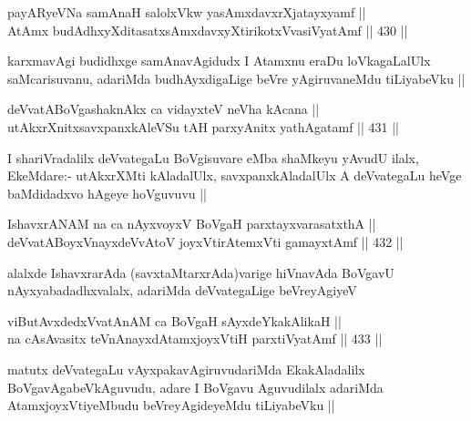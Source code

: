 \begin{shl}
payARyeVNa samAnaH salolxVkw yasAmxdavxrXjatayxyamf || \\
AtAmx budAdhxyXditasatxsAmxdavxyXtirikotxV\s vasiVyatAmf ||  430 || 
\end{shl}

\begin{artha}
karxmavAgi budidhxge samAnavAgidudx I Atamxnu eraDu loVkagaLalUlx saMcarisuvanu, adariMda budhAyxdigaLige beVre yAgiruvaneMdu tiLiyabeVku ||
\end{artha}


\begin{shl}
deVvatABoVgashaknAkx ca vidayxteV neVha kAcana || \\
utAkxrXnitxsavxpanxkAleVSu tAH parxyAnitx yathAgatamf ||  431 ||  
\end{shl}

\begin{artha}
I shariVradalilx deVvategaLu BoVgisuvare eMba shaMkeyu yAvudU ilalx, EkeMdare:- utAkxrXMti kAladalUlx, savxpanxkAladalUlx A deVvategaLu heVge baMdidadxvo hAgeye hoVguvuvu ||
\end{artha}


\begin{shl}
IshavxrANAM na ca nAyxvoyxV BoVgaH parxtayxvarasatxthA || \\
deVvatABoyxV\s nayxdeVvAtoV joyxVtirAtemxVti gamayxtAmf ||  432 ||  
\end{shl}

\begin{artha}
alalxde IshavxrarAda (savxtaMtarxrAda)varige hiVnavAda BoVgavU nAyxyabadadhxvalalx, adariMda deVvategaLige beVreyAgiyeV 
\end{artha}

\begin{shl}
viButAvxdedxVvatAnAM ca BoVgaH sAyxdeYkakAlikaH || \\
na cAsAvasitx teVnAnayxdAtamxjoyxVtiH parxtiVyatAmf ||  433 ||  
\end{shl}

\begin{artha}
matutx deVvategaLu vAyxpakavAgiruvudariMda EkakAladalilx BoVgavAgabeVkAguvudu, adare I BoVgavu Aguvudilalx adariMda AtamxjoyxVtiyeMbudu beVreyAgideyeMdu tiLiyabeVku ||
\end{artha}

